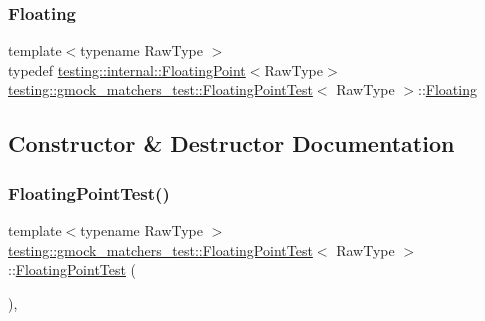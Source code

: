 \mbox{\label{classtesting_1_1gmock__matchers__test_1_1_floating_point_test_ae1459f93e1b18426625daf4fa98e80c6}} 
\subsubsection{\texorpdfstring{Floating}{Floating}}
{\footnotesize\ttfamily template$<$typename Raw\+Type $>$ \\
typedef \hyperlink{classtesting_1_1internal_1_1_floating_point}{testing\+::internal\+::\+Floating\+Point}$<$Raw\+Type$>$ \hyperlink{classtesting_1_1gmock__matchers__test_1_1_floating_point_test}{testing\+::gmock\+\_\+matchers\+\_\+test\+::\+Floating\+Point\+Test}$<$ Raw\+Type $>$\+::\hyperlink{classtesting_1_1gmock__matchers__test_1_1_floating_point_test_ae1459f93e1b18426625daf4fa98e80c6}{Floating}\hspace{0.3cm}{\ttfamily [protected]}}



\subsection{Constructor \& Destructor Documentation}
\mbox{\label{classtesting_1_1gmock__matchers__test_1_1_floating_point_test_af2fb52db3abf63903d78541c4c3a17d3}} 
\subsubsection{\texorpdfstring{Floating\+Point\+Test()}{FloatingPointTest()}}
{\footnotesize\ttfamily template$<$typename Raw\+Type $>$ \\
\hyperlink{classtesting_1_1gmock__matchers__test_1_1_floating_point_test}{testing\+::gmock\+\_\+matchers\+\_\+test\+::\+Floating\+Point\+Test}$<$ Raw\+Type $>$\+::\hyperlink{classtesting_1_1gmock__matchers__test_1_1_floating_point_test}{Floating\+Point\+Test} (\begin{DoxyParamCaption}{ }\end{DoxyParamCaption})\hspace{0.3cm}{\ttfamily [inline]}, {\ttfamily [protected]}}



